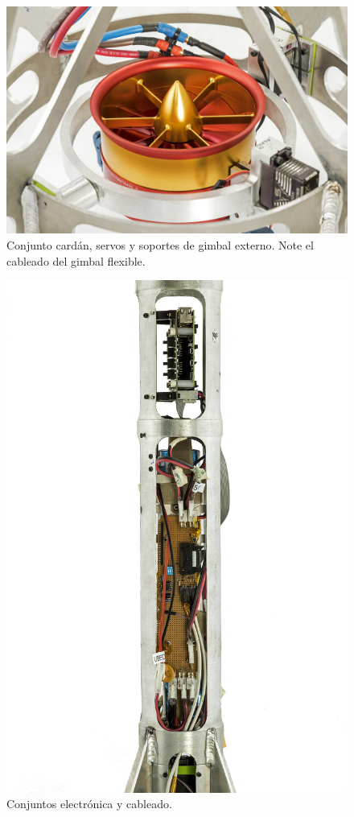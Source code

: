 \begin{figure}[htb]
    \centering
    \includegraphics[width=\linewidth]{fig/hq/gimbal_close.jpg}
    \caption{Conjunto cardán, servos y soportes de gimbal externo. Note el cableado del gimbal flexible.}
    \label{fig:hq/gimbal_close}
\end{figure}

\begin{figure}[htb]
    \centering
    \includegraphics[width=\linewidth]{fig/hq/electronics.jpg}
    \caption{Conjuntos electrónica y cableado.}
    \label{fig:hq/electronics}
\end{figure}

